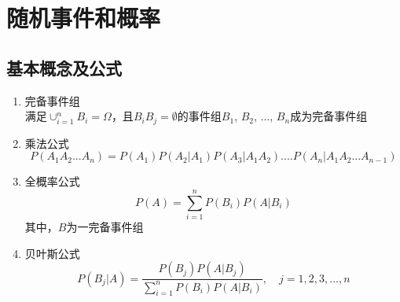 \section{随机事件和概率}
\subsection{基本概念及公式}
\begin{enumerate}
\item 完备事件组 \\
满足$\cup_{i=1}^nB_i=\Omega$，且$B_iB_j = \emptyset$的事件组$B_1$, $B_2$, ..., $B_n$成为完备事件组

\item 乘法公式
\begin{equation}
P(A_1A_2...A_n) = P(A_1)P(A_2|A_1)P(A_3|A_1A_2)....P(A_n|A_1A_2...A_{n-1})
\end{equation}

\item 全概率公式
\begin{equation}
P(A) = \sum_{i=1}^nP(B_i)P(A|B_i)
\end{equation}
其中，$B$为一完备事件组

\item 贝叶斯公式
\begin{equation}
P(B_j|A) = \frac{P(B_j)P(A|B_j)}{\sum_{i=1}^nP(B_i)P(A|B_i)},  \quad j = 1, 2, 3, ..., n
\end{equation}

\end{enumerate}
